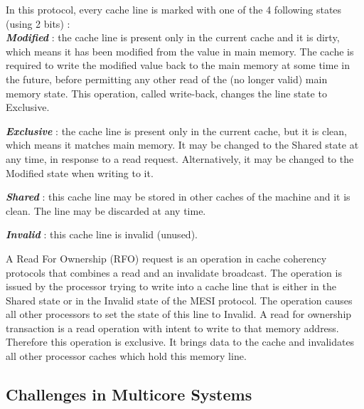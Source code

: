 \documentclass[diploma]{Styles/softlab-thesis}
\begin{document}
In this protocol, every cache line is marked with one of the 4 following states (using 2 bits) : \\

\textbf{\emph{Modified}} : the cache line is present only in the current cache and it is dirty, which means it has been modified from the value in main memory. The cache is required to write the modified value back to the main memory at some time in the future, before permitting any other read of the (no longer valid) main memory state. This operation, called write-back, changes the line state to Exclusive.

\textbf{\emph{Exclusive}} : the cache line is present only in the current cache, but it is clean, which means it matches main memory. It may be changed to the Shared state at any time, in response to a read request. Alternatively, it may be changed to the Modified state when writing to it.

\textbf{\emph{Shared}} : this cache line may be stored in other caches of the machine and it is clean. The line may be discarded at any time.

\textbf{\emph{Invalid}} : this cache line is invalid (unused).

A Read For Ownership (RFO) request is an operation in cache coherency protocols that combines a read and an invalidate broadcast. The operation is issued by the processor trying to write into a cache line that is either in the Shared state or in the Invalid state of the MESI protocol. The operation causes all other processors to set the state of this line to Invalid. A read for ownership transaction is a read operation with intent to write to that memory address. Therefore this operation is exclusive. It brings data to the cache and invalidates all other processor caches which hold this memory line.

\subsection{Challenges in Multicore Systems}
\end{document}
